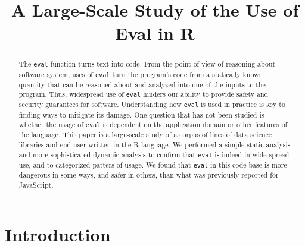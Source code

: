 \documentclass[conference]{IEEEtran}
\begin{document}
\title{A Large-Scale Study of the Use of Eval in R}
\author{\vspace{-.8cm}\IEEEauthorblockN{~}} %
\maketitle

\newcommand{\eg}{\emph{e.g.},\xspace}
\newcommand{\ie}{\emph{i.e.},\xspace}
\newcommand{\cf}{\emph{cf.}\xspace}
\newcommand{\summary}[1]{({\csname #1Min\endcsname} / {\csname #1Mean\endcsname} / {\csname #1Max\endcsname})}
\newcommand{\summaryrnd}[1]{({\csname #1MinRnd\endcsname} / {\csname #1MeanRnd\endcsname} / {\csname #1MaxRnd\endcsname})}

\newcommand{\eval}{\texttt{eval}\xspace}
\newcommand{\parse}{\texttt{parse}\xspace}
\newcommand{\source}{\texttt{source}\xspace}
\newcommand{\substitute}{\texttt{substitute}\xspace}
\renewcommand{\c}[1]{\lstinline{#1}\xspace}
\newcommand{\miss}[1]{{\textcolor{red}{#1}}\xspace}
\newcommand{\evil}{\emph{evil}\xspace}
\newcommand{\instrumentr}{\emph{instrumentr}\xspace}
\newcommand{\rdyntrace}{\emph{R-dyntrace}\xspace}
\newcommand{\covr}{\emph{covr}\xspace}
\newcommand{\runr}{\emph{runr}\xspace}

\begin{abstract}
  The \eval function turns text into code. From the point of view of
  reasoning about software system, uses of \eval turn the program's code
  from a statically known quantity that can be reasoned about and analyzed
  into one of the inputs to the program. Thus, widespread use of \eval
  hinders our ability to provide safety and security guarantees for
  software. Understanding how \eval is used in practice is key to finding
  ways to mitigate its damage. One question that has not been studied is
  whether the usage of \eval is dependent on the application domain or other
  features of the language. This paper is a large-scale study of a corpus of
  \CorpusAllCodeRnd lines of data science libraries and end-user written in
  the R language. We performed a simple static analysis and more
  sophisticated dynamic analysis to confirm that \eval is indeed in wide
  spread use, and to categorized patters of usage. We found that \eval in
  this code base is more dangerous in some ways, and safer in others, than
  what was previously reported for JavaScript.
\end{abstract}

\section{Introduction}
\end{document}
